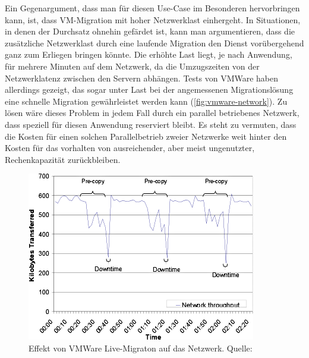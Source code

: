 Ein Gegenargument, dass man für diesen Use-Case im Besonderen
hervorbringen kann, ist, dass VM-Migration mit hoher Netzwerklast
einhergeht. In Situationen, in denen der Durchsatz ohnehin gefärdet
ist, kann man argumentieren, dass die zusätzliche Netzwerklast durch
eine laufende Migration den Dienst vorübergehend ganz zum Erliegen
bringen könnte. Die erhöhte Last liegt, je nach Anwendung, für mehrere
Minuten auf dem Netzwerk, da die Umzugszeiten von der Netzwerklatenz
zwischen den Servern abhängen. Tests von VMWare haben allerdings
gezeigt, das sogar unter Last bei der angemessenen Migrationslösung
eine schnelle Migration gewährleistet werden kann
(\autoref{fig:vmware-network}). Zu lösen wäre dieses Problem in jedem
Fall durch ein parallel betriebenes Netzwerk, dass speziell für diesen
Anwendung reserviert bleibt. Es steht zu vermuten, dass die Kosten für
einen solchen Parallelbetrieb zweier Netzwerke weit hinter den Kosten
für das vorhalten von ausreichender, aber meist ungenutzter,
Rechenkapazität zurückbleiben.
\begin{figure}[b]
  \centering
  \includegraphics[width=0.9\linewidth]{images/vmware-network}
  \caption{Effekt von VMWare Live-Migraton auf das
    Netzwerk. Quelle:~\cite{nelson2005fast}}
  \label{fig:vmware-network}
\end{figure}

